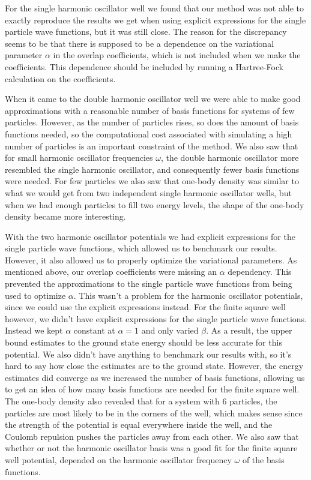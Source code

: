 \documentclass[../main.tex]{subfiles}
\begin{document}
For the single harmonic oscillator well we found that our method was not able to exactly reproduce the results we get when using explicit expressions for the single particle wave functions, but it was still close. The reason for the discrepancy seems to be that there is supposed to be a dependence on the variational parameter $\alpha$ in the overlap coefficients, which is not included when we make the coefficients. This dependence should be included by running a Hartree-Fock calculation on the coefficients.

When it came to the double harmonic oscillator well we were able to make good approximations with a reasonable number of basis functions for systems of few particles. However, as the number of particles rises, so does the amount of basis functions needed, so the computational cost associated with simulating a high number of particles is an important constraint of the method. We also saw that for small harmonic oscillator frequencies $\omega$, the double harmonic oscillator more resembled the single harmonic oscillator, and consequently fewer basis functions were needed. For few particles we also saw that one-body density was similar to what we would get from two independent single harmonic oscillator wells, but when we had enough particles to fill two energy levels, the shape of the one-body density became more interesting.

With the two harmonic oscillator potentials we had explicit expressions for the single particle wave functions, which allowed us to benchmark our results. However, it also allowed us to properly optimize the variational parameters. As mentioned above, our overlap coefficients were missing an $\alpha$ dependency. This prevented the approximations to the single particle wave functions from being used to optimize $\alpha$. This wasn't a problem for the harmonic oscillator potentials, since we could use the explicit expressions instead. For the finite square well however, we didn't have explicit expressions for the single particle wave functions. Instead we kept $\alpha$ constant at $\alpha = 1$ and only varied $\beta$. As a result, the upper bound estimates to the ground state energy should be less accurate for this potential. We also didn't have anything to benchmark our results with, so it's hard to say how close the estimates are to the ground state. However, the energy estimates did converge as we increased the number of basis functions, allowing us to get an idea of how many basis functions are needed for the finite square well. The one-body density also revealed that for a system with $6$ particles, the particles are most likely to be in the corners of the well, which makes sense since the strength of the potential is equal everywhere inside the well, and the Coulomb repulsion pushes the particles away from each other. We also saw that whether or not the harmonic oscillator basis was a good fit for the finite square well potential, depended on the harmonic oscillator frequency $\omega$ of the basis functions.
\end{document}
